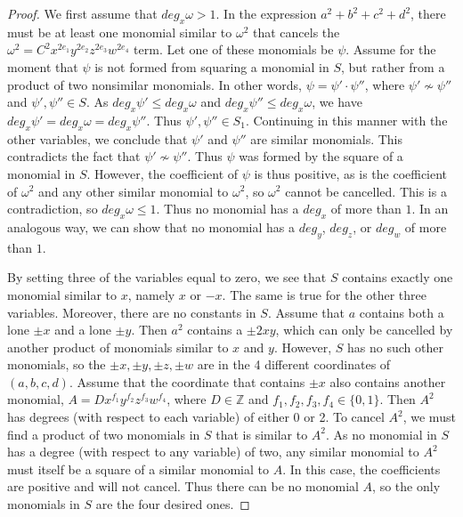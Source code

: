 \documentclass[12pt]{article}
\theoremstyle{definition}
\theoremstyle{remark}
\newcommand{\Zzz}{\mathbb Z}
\numberwithin{equation}{section}
\begin{document}
\begin{proof}
We first assume that \(deg_x \omega > 1 \).
In the expression  
\(a^2 + b^2 + c^2 + d^2\), there must be at least one monomial similar to \( \omega^2 \)
that cancels the \( \omega^2 = C^2x^{2e_1}y^{2e_2}z^{2e_3}w^{2e_4}\) term.
Let one of these monomials be \( \psi \). Assume for the moment that \( \psi \)
is not formed from squaring a monomial in \(S\), but rather
from a product of two nonsimilar monomials.
In other words, \( \psi = \psi' \cdot \psi''\), where \( \psi' \nsim \psi'' \)
and \( \psi' , \psi'' \in S \). As \( deg_x \psi' \leq deg_x \omega \)
and \( deg_x \psi'' \leq deg_x \omega \),
we have \( deg_x \psi' = deg_x \omega = deg_x \psi'' \).
Thus \( \psi' , \psi'' \in S_1 \). Continuing in this manner
with the other variables, we
conclude that \( \psi' \) and \( \psi'' \) are similar monomials.
This contradicts the fact that \( \psi' \nsim \psi'' \). Thus \( \psi \) was
formed by the square of a monomial in \( S \). However, the coefficient
of \( \psi \) is thus positive, as is the coefficient of \( \omega^2 \) and
any other similar monomial to \( \omega^2 \), so \( \omega^2 \) cannot be cancelled. This is
a contradiction, so \( deg_x \omega \leq 1 \). Thus no monomial has a \( deg_x \) of more
than \(1\). In an analogous way, we can show that no monomial has a \( deg_y \), \( deg_z \),
or \( deg_w \) of more than \(1\).

By setting three of the variables equal to zero, we see that \( S \) contains
exactly one monomial similar to \( x \), namely \( x\) or \( -x \). The same is true for
the other three variables. Moreover, there are no constants in \( S \). Assume that
\( a \) contains both a lone \( \pm x \) and a lone \( \pm y \). Then \(a^2\) contains
a \( \pm 2xy \), which can only be cancelled by another product of monomials similar to
\( x \) and \(y\). However, \( S \) has no such other monomials,
so the \( \pm x, \pm y, \pm z, \pm w \) are in the 4 different coordinates of
\( (a, b, c, d) \). Assume that the coordinate that contains \( \pm x \) also contains
another monomial, \( A = Dx^{f_1}y^{f_2}z^{f_3}w^{f_4}\), where \( D \in \Zzz \)
and \( f_1,f_2,f_3,f_4 \in \{0,1\} \). Then \( A^2 \) has degrees (with respect to
each variable) of either 0 or 2. To cancel \( A^2 \), we must find a product of two
monomials in \( S \) that is similar to \( A^2 \). As no monomial in \( S \) has a degree
(with respect to any variable) of two, any similar monomial to \( A^2 \) must itself be
a square of a similar monomial to \( A \). In this case, the coefficients are
positive and will not cancel. Thus there can be no monomial \( A \), so the only monomials
in \( S \) are the four desired ones.
\end{proof}
\end{document}
